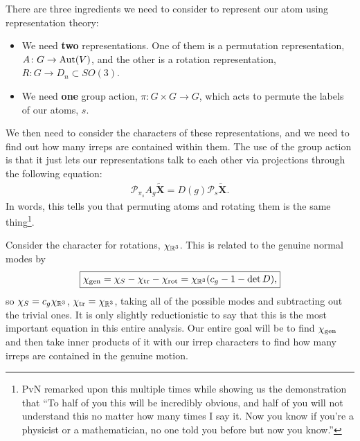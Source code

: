 \documentclass[11pt]{article}
\begin{document}
There are three ingredients we need to consider
to represent our atom using representation theory:
\begin{itemize}
    \item We need \textbf{two} representations. One of them
    is a permutation representation, $A \colon G \to \operatorname{Aut}(V)$,
    and the other is a rotation representation, $R \colon G \to D_n \subset SO(3)$.
    \item We need \textbf{one} group action, $\pi \colon G \times G \to G$,
    which acts to permute the labels of our atoms, $s$.
\end{itemize}

We then need to consider the characters of these representations,
and we need to find out how many irreps are contained within them.
The use of the group action is that it just lets our representations 
talk to each other via projections through the following equation:
\begin{align*}
    \boxed{\mathcal{P}_{\pi_s} A_g \widetilde{\mathbf{X}} = D(g) \mathcal{P}_s \widetilde{\mathbf{X}}.}
\end{align*}
In words, this tells you that permuting atoms and rotating them
is the same thing\footnote{PvN remarked upon this multiple times
while showing us the demonstration that ``To half of you this will
be incredibly obvious, and half of you will not understand
this no matter how many times I say it. Now you know if you're
a physicist or a mathematician, no one told you before but now you know.''
}.

Consider the character for rotations, $\chi_{\mathbb{R}^3}$. This is related
to the genuine normal modes by
\begin{align*}
    \boxed{\chi_{\rm gen} = \chi_S - \chi_{\rm tr} - \chi_{\rm rot} = \chi_{\mathbb{R}^3} (c_g - 1 - \operatorname{det}{D}),}
\end{align*}
so $\chi_S = c_g \chi_{\mathbb{R}^3}$, $\chi_{\rm tr} = \chi_{\mathbb{R}^3}$,
taking all of the possible modes and subtracting out the trivial ones.
It is only slightly reductionistic to say that this is the most important equation
in this entire analysis. Our entire goal will be to find $\chi_{\rm gen}$
and then take inner products of it with our irrep characters to find how 
many irreps are contained in the genuine motion.

\end{document}
